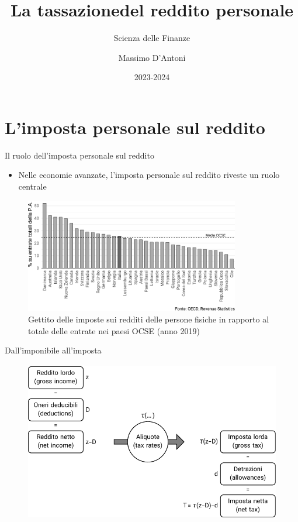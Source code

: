 \documentclass[11pt]{beamer}
\institute{Università di Siena}
\author{Massimo D'Antoni}
\date{2023-2024}
\title{La tassazione\newline del reddito personale}
\subtitle{Scienza delle Finanze}
\newcommand\€{\,\text{€}}
\begin{document}
\maketitle

\section{L'imposta personale sul reddito}

\begin{frame}{Il ruolo dell'imposta personale sul reddito}
\begin{itemize}
\item Nelle economie avanzate, l'imposta personale sul reddito riveste un ruolo
centrale
\end{itemize}

\begin{figure}
\centering
\includegraphics[height=5cm]{./figure/gettito-imposta-personale-OCSE.pdf}
\caption{Gettito delle imposte sui redditi delle persone fisiche in rapporto al totale delle entrate nei paesi OCSE (anno 2019)}
\end{figure}
\end{frame}

\begin{frame}{Dall'imponibile all'imposta}
\begin{figure}
\centering
\includegraphics[height=7cm]{./figure/da-reddito-a-imposta.pdf}
\end{figure}
\end{frame}
\end{document}
